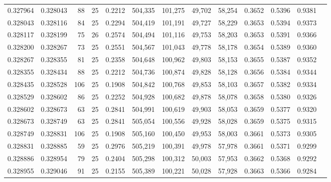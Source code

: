 \begin{tabular}{rrrrrrrrrrrrr}
0.327964 & 0.328043 &    88 &  25 &                                     0.2212 & 504,335 & 101,275 &  49,702 &  58,254 & 0.3652 & 0.5396 & 0.9381 \\
0.328043 & 0.328116 &    84 &  25 &                                     0.2294 & 504,419 & 101,191 &  49,727 &  58,229 & 0.3653 & 0.5394 & 0.9373 \\
0.328117 & 0.328199 &    75 &  26 &                                     0.2574 & 504,494 & 101,116 &  49,753 &  58,203 & 0.3653 & 0.5391 & 0.9366 \\
0.328200 & 0.328267 &    73 &  25 &                                     0.2551 & 504,567 & 101,043 &  49,778 &  58,178 & 0.3654 & 0.5389 & 0.9360 \\
0.328267 & 0.328355 &    81 &  25 &                                     0.2358 & 504,648 & 100,962 &  49,803 &  58,153 & 0.3655 & 0.5387 & 0.9352 \\
0.328355 & 0.328434 &    88 &  25 &                                     0.2212 & 504,736 & 100,874 &  49,828 &  58,128 & 0.3656 & 0.5384 & 0.9344 \\
0.328435 & 0.328528 &   106 &  25 &                                     0.1908 & 504,842 & 100,768 &  49,853 &  58,103 & 0.3657 & 0.5382 & 0.9334 \\
0.328529 & 0.328602 &    86 &  25 &                                     0.2252 & 504,928 & 100,682 &  49,878 &  58,078 & 0.3658 & 0.5380 & 0.9326 \\
0.328602 & 0.328673 &    63 &  25 &                                     0.2841 & 504,991 & 100,619 &  49,903 &  58,053 & 0.3659 & 0.5377 & 0.9320 \\
0.328673 & 0.328749 &    63 &  25 &                                     0.2841 & 505,054 & 100,556 &  49,928 &  58,028 & 0.3659 & 0.5375 & 0.9315 \\
0.328749 & 0.328831 &   106 &  25 &                                     0.1908 & 505,160 & 100,450 &  49,953 &  58,003 & 0.3661 & 0.5373 & 0.9305 \\
0.328831 & 0.328885 &    59 &  25 &                                     0.2976 & 505,219 & 100,391 &  49,978 &  57,978 & 0.3661 & 0.5371 & 0.9299 \\
0.328886 & 0.328954 &    79 &  25 &                                     0.2404 & 505,298 & 100,312 &  50,003 &  57,953 & 0.3662 & 0.5368 & 0.9292 \\
0.328955 & 0.329046 &    91 &  25 &                                     0.2155 & 505,389 & 100,221 &  50,028 &  57,928 & 0.3663 & 0.5366 & 0.9284 \\

\end{tabular}

